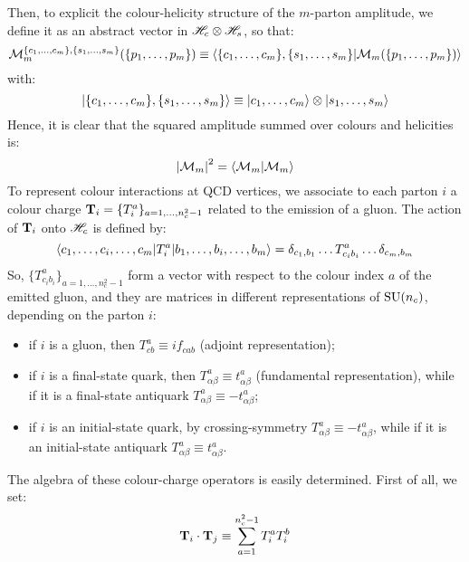 Then, to explicit the colour-helicity structure of the $ m $-parton amplitude, we define it as an abstract vector in $ \mathscr{H}_c \otimes \mathscr{H}_s $, so that:
\begin{equation}
  \mathcal{M}_m^{\{c_1, \dots, c_m\}, \{s_1, \dots, s_m\}}(\{p_1, \dots, p_m\}) \equiv \braket{\{c_1, \dots, c_m\}, \{s_1, \dots, s_m\} | \mathcal{M}_m(\{p_1, \dots, p_m\})}
\end{equation}
with:
\begin{equation*}
  \ket{\{c_1, \dots, c_m\}, \{s_1, \dots, s_m\}} \equiv \ket{c_1, \dots, c_m} \otimes \ket{s_1, \dots, s_m}
\end{equation*}
Hence, it is clear that the squared amplitude summed over colours and helicities is:
\begin{equation}
  \left\lvert\mathcal{M}_m\right\rvert^2 = \braket{\mathcal{M}_m | \mathcal{M}_m}
\end{equation}
To represent colour interactions at QCD vertices, we associate to each parton $ i $ a colour charge $ \mathbf{T}_i = \{T_i^a\}_{a = 1, \dots, n_c^2 - 1} $ related to the emission of a gluon. The action of $ \mathbf{T}_i $ onto $ \mathscr{H}_c $ is defined by:
\begin{equation}
  \braket{c_1, \dots, c_i, \dots, c_m | T_i^a | b_1, \dots, b_i, \dots, b_m} = \delta_{c_1, b_1} \dots T^a_{c_i b_i} \dots \delta_{c_m, b_m}
  \label{eq:t-act}
\end{equation}
So, $ \{T^a_{c_i b_i}\}_{a = 1, \dots, n_c^2 - 1} $ form a vector with respect to the colour index $ a $ of the emitted gluon, and they are matrices in different representations of $ \mathrm{SU}(n_c) $, depending on the parton $ i $:
\begin{itemize}
  \item if $ i $ is a gluon, then $ T^a_{cb} \equiv i f_{cab} $ (adjoint representation);
  \item if $ i $ is a final-state quark, then $ T^a_{\alpha \beta} \equiv t^a_{\alpha \beta} $ (fundamental representation), while if it is a final-state antiquark $ T^a_{\alpha \beta} \equiv - t^a_{\alpha \beta} $;
  \item if $ i $ is an initial-state quark, by crossing-symmetry $ T^a_{\alpha \beta} \equiv - t^a_{\alpha \beta}$, while if it is an initial-state antiquark $ T^a_{\alpha \beta} \equiv t^a_{\alpha \beta} $.
\end{itemize}
The algebra of these colour-charge operators is easily determined. First of all, we set:
\begin{equation}
  \mathbf{T}_i \cdot \mathbf{T}_j \equiv \sum_{a = 1}^{n_c^2 - 1} T_i^a T_i^b
  \label{eq:t-dot}
\end{equation}
